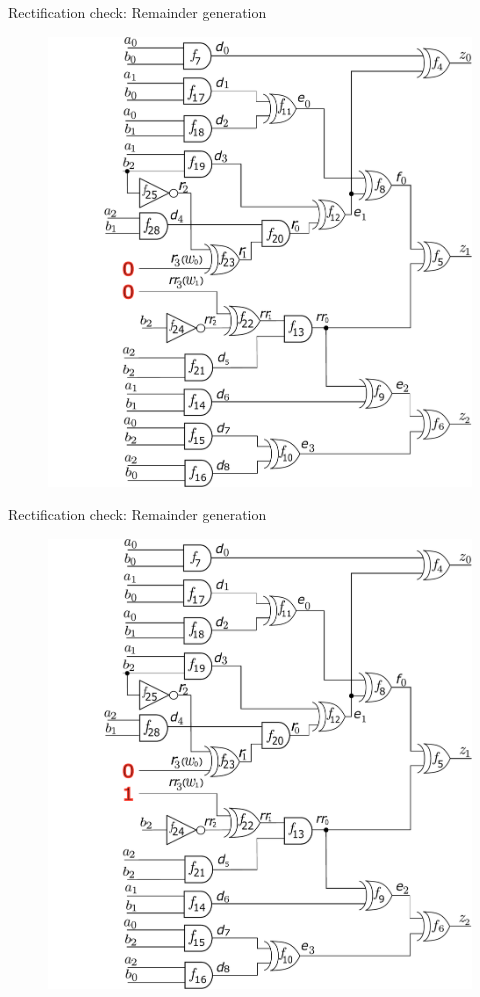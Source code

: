 \begin{frame}{\large Rectification check: Remainder generation}
\begin{figure}[hbt]
\centering
    \includegraphics[scale = 0.28]{mas_3_ddc_mfr_b_00.pdf}
    \caption*{}
\end{figure}
\end{frame}

\begin{frame}{\large Rectification check: Remainder generation}
\begin{figure}[hbt]
\centering
    \includegraphics[scale = 0.28]{mas_3_ddc_mfr_b_10.pdf}
    \caption*{}
\end{figure}
\end{frame}

